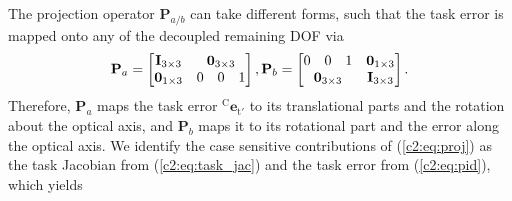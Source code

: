 The projection operator $\mathbf{P}_{a/b}$ can take different forms, such that the task error is mapped onto any of the decoupled remaining DOF via
\begin{equation}
    \mathbf{P}_a = \begin{bmatrix}
        \mathbf{I}_{3\times3} & \multicolumn{3}{c}{\mathbf{0}_{3\times3}} \\
        \mathbf{0}_{1\times3} & 0 & 0 & 1
    \end{bmatrix},
    \mathbf{P}_b =
    \begin{bmatrix}
        0 & 0 & 1 & \mathbf{0}_{1\times3} \\
        \multicolumn{3}{c}{\mathbf{0}_{3\times3}} & \mathbf{I}_{3\times3}
    \end{bmatrix}.
    \label{c2:eq:projection}
\end{equation}
Therefore, $\mathbf{P}_a$ maps the task error $^\text{C}\mathbf{e}_{\text{t}'}$ to its translational parts and the rotation about the optical axis, and $\mathbf{P}_b$ maps it to its rotational part and the error along the optical axis. We identify the case sensitive contributions of (\eqref{c2:eq:proj}) as the task Jacobian from (\eqref{c2:eq:task_jac}) and the task error from (\eqref{c2:eq:pid}), which yields
